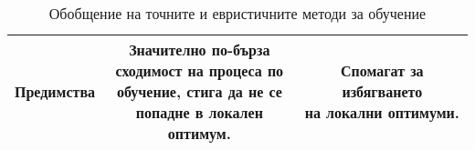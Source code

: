 \begin{table}[h!]
\begin{tabular}{ | c | c | c |}
      \hline
      \cellcolor{gray!15}
      Предимства &  \makecell{Значително по-бърза\\ сходимост на процеса по\\ обучение, стига да не се\\ попадне в локален оптимум.}  & \makecell{Спомагат за избягването\\ на локални оптимуми.}  \\
      \hline
    \end{tabular}
    \caption{Обобщение на точните и евристичните методи за обучение}
	\label{tab000101}
\end{table}